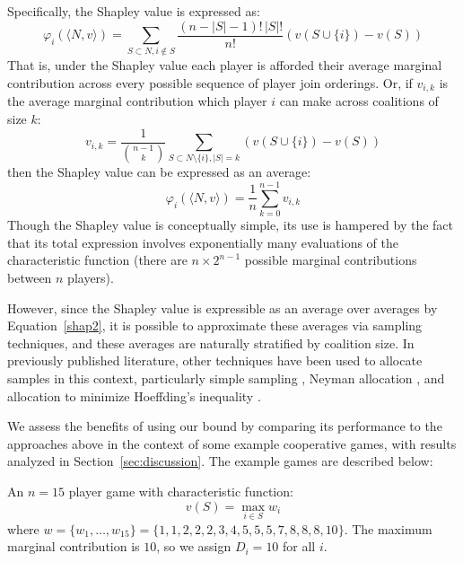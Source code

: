 Specifically, the Shapley value is expressed as:
\begin{equation}\label{shap1}\varphi_i(\langle N,v\rangle) = \sum_{S\subset N, i\notin S}\frac{(n-|S|-1)!\,|S|!}{n!}(v(S\cup\{i\})-v(S))\end{equation}
That is, under the Shapley value each player is afforded their average marginal contribution across every possible sequence of player join orderings.  
Or, if $v_{i,k}$ is the average marginal contribution which player $i$ can make across coalitions of size $k$:
\begin{equation}
v_{i,k} = \frac{1}{\binom{n-1}{k}}\sum_{S\subset N\setminus \{ i\} , |S|=k} %
(v(S\cup\{i\})-v(S))
\end{equation}
then the Shapley value can be expressed as an average:
\begin{equation}\label{shap2} \varphi_i(\langle N,v\rangle) = \frac{1}{n}\sum_{k=0}^{n-1}v_{i,k} \end{equation}
Though the Shapley value is conceptually simple, its use is hampered by the fact that its total expression involves exponentially many evaluations of the characteristic function (there are $n\times 2^{n-1}$ possible marginal contributions between $n$ players).

However, since the Shapley value is expressible as an average over averages by Equation~\eqref{shap2}, 
it is possible to approximate these averages via sampling techniques, and these averages are naturally stratified by coalition size.
In previously published literature, other techniques have been used to allocate samples in this context, particularly simple sampling \citep{DBLP:journals/cor/CastroGT09}, Neyman allocation \citep{CASTRO2017180,DBLP:journals/tsg/OBrienGR15}, and allocation to minimize Hoeffding's inequality \citep{2013arXiv1306.4265M}.

We assess the benefits of using our bound by comparing its performance to the approaches above in the context of some example cooperative games, with results analyzed in Section~\ref{sec:discussion}.
The example games are described below:

\begin{example_game}
An $n=15$ player game with characteristic function:
$$v(S)=\max_{i\in S}w_i$$
where
$w=\{w_1,\dots,w_{15}\} %
=\{ 1, 1, 2, 2, 2, 3, 4, 5, 5, 5, 7, 8, 8, 8, 10\}$.
The maximum marginal contribution is $10$, so we assign $D_i=10$ for all $i$.
\end{example_game}


